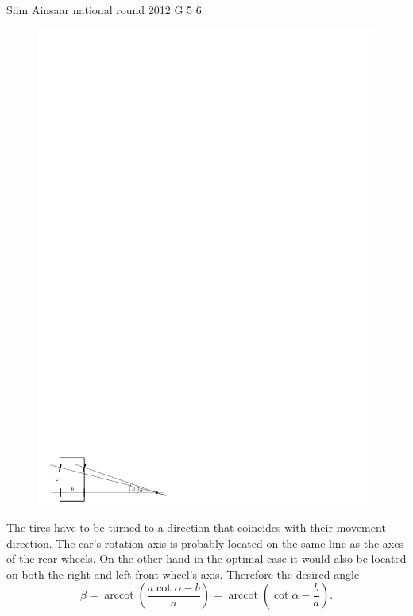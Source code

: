 \documentclass[11pt]{article}
\begin{document}
{Siim Ainsaar} %
{national round} %
{2012} %
{G 5} %
{6} %
{

\ifEngSolution
\begin{figure}
\includegraphics[width=\linewidth]{2012-v3g-05-r_joonis}
\end{figure}
The tires have to be turned to a direction that coincides with their movement direction. The car’s rotation axis is probably located on the same line as the axes of the rear wheels. On the other hand in the optimal case it would also be located on both the right and left front wheel’s axis. Therefore the desired angle
\[
\beta =
\operatorname{arccot} \left( \frac{a \cot\alpha - b}{a} \right)
=
\operatorname{arccot} \left( \cot\alpha - \frac ba \right).
\]
\fi
}
\end{document}
